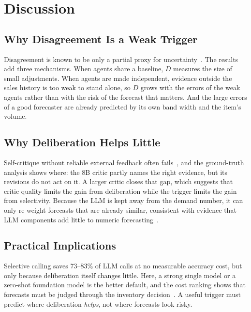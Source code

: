 \documentclass[conference]{IEEEtran}
\begin{document}
\section{Discussion}\label{sec:discussion}

\subsection{Why Disagreement Is a Weak Trigger}
Disagreement is known to be only a partial proxy for uncertainty~\cite{zarnowitz1987,whitaker1998}.
The results add three mechanisms. When agents share a baseline, $D$ measures the size of small
adjustments. When agents are made independent, evidence outside the sales history is too weak to
stand alone, so $D$ grows with the errors of the weak agents rather than with the risk of the
forecast that matters. And the large errors of a good forecaster are already predicted by its own
band width and the item's volume.

\subsection{Why Deliberation Helps Little}
Self-critique without reliable external feedback often fails~\cite{huang2024}, and the ground-truth
analysis shows where: the 8B critic partly names the right evidence, but its revisions do not act on
it. A larger critic closes that gap, which suggests that critic quality limits the gain from
deliberation while the trigger limits the gain from selectivity. Because the LLM is kept away from
the demand number, it can only re-weight forecasts that are already similar, consistent with
evidence that LLM components add little to numeric forecasting~\cite{tan2024}.

\subsection{Practical Implications}
Selective calling saves 73--83\% of LLM calls at no measurable accuracy cost, but only because
deliberation itself changes little. Here, a strong single model or a zero-shot foundation model is
the better default, and the cost ranking shows that forecasts must be judged through the inventory
decision~\cite{syntetos2010,kourentzes2020}. A useful trigger must predict where deliberation
\emph{helps}, not where forecasts look risky.
\end{document}
